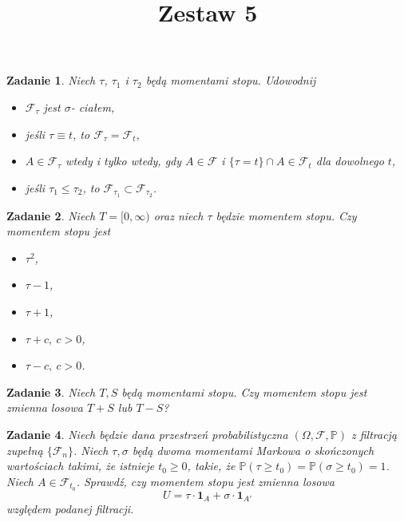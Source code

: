 \documentclass{mwart}
\title{Zestaw 5}
\newtheorem{zd}{Zadanie}
\begin{document}

\maketitle

\begin{zd}
Niech $\tau$, $\tau_1$ i $\tau_2$ będą momentami stopu. Udowodnij
\begin{itemize}
\item $\mathcal{F}_{\tau}$ jest $\sigma$- ciałem,
\item jeśli $\tau \equiv t$, to $\mathcal{F}_{\tau} = \mathcal{F}_t$,
\item $A \in \mathcal{F}_{\tau}$ wtedy i tylko wtedy, gdy $A\in \mathcal{F}$ i $\{\tau = t\} \cap A \in \mathcal{F}_t$ dla dowolnego $t$,
\item jeśli $\tau_1 \leq \tau_2$, to $\mathcal{F}_{\tau_1} \subset \mathcal{F}_{\tau_2}$.
\end{itemize}
\end{zd}

\begin{zd}
Niech $T= [0, \infty)$ oraz niech $\tau$ będzie momentem stopu. Czy momentem stopu jest
\begin{itemize}
\item $\tau^2$,
\item $\tau -1$,
\item $\tau +1$,
\item $\tau + c,\ c>0$,
\item $\tau - c,\ c>0$.
\end{itemize}
\end{zd}

\begin{zd}
		Niech $T, S$ będą momentami stopu. Czy momentem stopu jest zmienna losowa $T + S$ lub $T - S$?
\end{zd}

\begin{zd}
	Niech będzie dana przestrzeń probabilistyczna $(\Omega, \mathcal{F}, \mathbb{P})$ z filtracją zupełną $\{\mathcal{F}_n\}$. Niech $\tau, \sigma$ będą dwoma momentami Markowa o skończonych wartościach takimi, że istnieje $t_0 \geq 0$, takie, że $\mathbb{P}(\tau \geq t_0) = \mathbb{P}(\sigma \geq t_0) = 1$. Niech $A\in \mathcal{F}_{t_0}$. Sprawdź, czy momentem stopu jest zmienna losowa
	\begin{displaymath}
	U = \tau \cdot\pmb{1}_A + \sigma \cdot \pmb{1}_{A'}
	\end{displaymath}
	względem podanej filtracji.
\end{zd}
\end{document}
